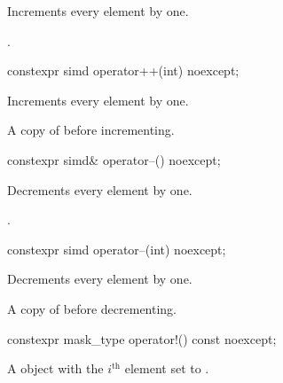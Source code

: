 \begin{itemdescr}
  \pnum{}

  \pnum\effects
  Increments every element by one.

  \pnum\returns
  .
\end{itemdescr}

\begin{itemdecl}
constexpr simd operator++(int) noexcept;
\end{itemdecl}

\begin{itemdescr}
  \pnum{}

  \pnum\effects
  Increments every element by one.

  \pnum\returns
  A copy of  before incrementing.
\end{itemdescr}

\begin{itemdecl}
constexpr simd& operator--() noexcept;
\end{itemdecl}

\begin{itemdescr}
  \pnum{}

  \pnum\effects
  Decrements every element by one.

  \pnum\returns
  .
\end{itemdescr}

\begin{itemdecl}
constexpr simd operator--(int) noexcept;
\end{itemdecl}

\begin{itemdescr}
  \pnum{}

  \pnum\effects
  Decrements every element by one.

  \pnum\returns
  A copy of  before decrementing.
\end{itemdescr}

\begin{itemdecl}
constexpr mask_type operator!() const noexcept;
\end{itemdecl}

\begin{itemdescr}
  \pnum{}

  \pnum\returns
  A  object with the $i^\text{th}$ element set to  \foralli.
\end{itemdescr}

